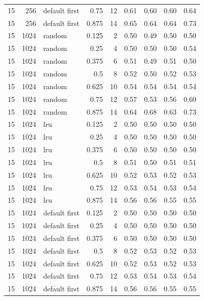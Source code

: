 \begin{longtable}{@{}rrlrrrrrr@{}}
15 & 256 & default first & 0.75 & 12 & 0.61 & 0.60 & 0.60 & 0.64 \\
15 & 256 & default first & 0.875 & 14 & 0.65 & 0.64 & 0.64 & 0.73 \\
15 & 1024 & random & 0.125 & 2 & 0.50 & 0.49 & 0.50 & 0.50 \\
15 & 1024 & random & 0.25 & 4 & 0.50 & 0.50 & 0.50 & 0.54 \\
15 & 1024 & random & 0.375 & 6 & 0.51 & 0.49 & 0.51 & 0.50 \\
15 & 1024 & random & 0.5 & 8 & 0.52 & 0.50 & 0.52 & 0.53 \\
15 & 1024 & random & 0.625 & 10 & 0.54 & 0.54 & 0.54 & 0.54 \\
15 & 1024 & random & 0.75 & 12 & 0.57 & 0.53 & 0.56 & 0.60 \\
15 & 1024 & random & 0.875 & 14 & 0.64 & 0.68 & 0.63 & 0.73 \\
15 & 1024 & lru & 0.125 & 2 & 0.50 & 0.50 & 0.50 & 0.50 \\
15 & 1024 & lru & 0.25 & 4 & 0.50 & 0.50 & 0.50 & 0.50 \\
15 & 1024 & lru & 0.375 & 6 & 0.50 & 0.50 & 0.50 & 0.50 \\
15 & 1024 & lru & 0.5 & 8 & 0.51 & 0.50 & 0.51 & 0.51 \\
15 & 1024 & lru & 0.625 & 10 & 0.52 & 0.53 & 0.52 & 0.53 \\
15 & 1024 & lru & 0.75 & 12 & 0.53 & 0.54 & 0.53 & 0.54 \\
15 & 1024 & lru & 0.875 & 14 & 0.56 & 0.56 & 0.55 & 0.55 \\
15 & 1024 & default first & 0.125 & 2 & 0.50 & 0.50 & 0.50 & 0.50 \\
15 & 1024 & default first & 0.25 & 4 & 0.50 & 0.50 & 0.50 & 0.50 \\
15 & 1024 & default first & 0.375 & 6 & 0.50 & 0.50 & 0.50 & 0.50 \\
15 & 1024 & default first & 0.5 & 8 & 0.52 & 0.53 & 0.52 & 0.53 \\
15 & 1024 & default first & 0.625 & 10 & 0.52 & 0.53 & 0.52 & 0.53 \\
15 & 1024 & default first & 0.75 & 12 & 0.53 & 0.54 & 0.53 & 0.54 \\
15 & 1024 & default first & 0.875 & 14 & 0.56 & 0.56 & 0.55 & 0.55 \\
\bottomrule
\end{longtable}
